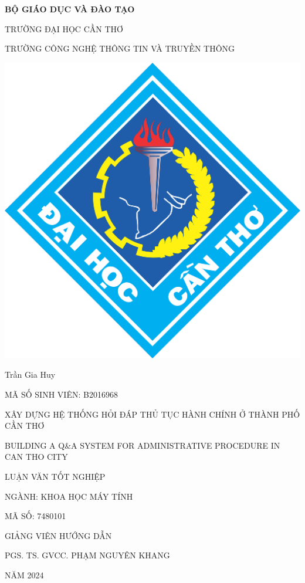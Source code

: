 \begin{center}
    \vspace{-1cm}
    \bf BỘ GIÁO DỤC VÀ ĐÀO TẠO

    TRƯỜNG ĐẠI HỌC CẦN THƠ

    TRƯỜNG CÔNG NGHỆ THÔNG TIN VÀ TRUYỀN THÔNG

    \vspace{.5cm}

    \noindent
    \begin{minipage}
        {\linewidth}
        \centering
        \includegraphics[width=.15\linewidth]{./assets/images/logo-ctu.png}
    \end{minipage}

    \vspace{.5cm}

    Trần Gia Huy

    MÃ SỐ SINH VIÊN: B2016968

    \vspace{1cm}

    {\large
        XÂY DỰNG HỆ THỐNG HỎI ĐÁP THỦ TỤC HÀNH CHÍNH Ở THÀNH PHỐ CẦN THƠ

        \vspace{.5cm}
        BUILDING A Q\&A SYSTEM FOR ADMINISTRATIVE PROCEDURE IN CAN THO CITY
    }

    \vspace{1.5cm}

    LUẬN VĂN TỐT NGHIỆP

    NGÀNH: KHOA HỌC MÁY TÍNH

    MÃ SỐ: 7480101

    \vspace{1.5cm}

    GIẢNG VIÊN HƯỚNG DẪN

    PGS. TS. GVCC. PHẠM NGUYÊN KHANG

    \vspace{1.5cm}

    NĂM 2024
\end{center}